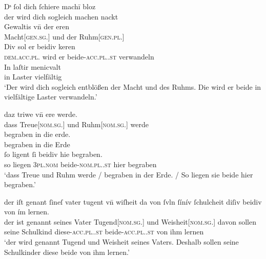 \begin{exe}
\ex \label{ex:beid2p2combrem}
	\begin{xlist}
	\ex \label{ex:beid2p2combrem_1}
		\gll Dˢ ſol dich ſchiere machī bloz \\
			der wird dich sogleich machen nackt \\
	\sn \gll Gewaltis vn̄ der eren \\
			Macht[\textsc{gen.sg.\FemI}] und der Ruhm[\textsc{gen.pl.\FemI}] \\
	\sn \gll Div sol er beidiv keren \\
			\textsc{dem.acc.pl.\NeutI} wird er beide-\textsc{acc.pl.\NeutI.st}
			verwandeln \\
	\sn \gll In laſtir menicvalt \\
			in Laster vielfältig \\
		\trans `Der wird dich sogleich entblößen der Macht und des Ruhms.
			Die wird er beide in vielfältige Laster verwandeln.'
			\parencite[M317: V.~13020--13023]{rem}

	\ex \label{ex:beid2p2combrem_2}
		\gll daz triwe vn̄ ere werde. \\
			dass Treue[\textsc{nom.sg.\FemI}] und Ruhm[\textsc{nom.sg.\FemI}] werde \\
	\sn \gll begraben in die erde. \\
			begraben in die Erde \\
	\sn \gll ſo ligent ſi beidiv hie begraben. \\
			so liegen \textsc{3pl\subI.nom} beide-\textsc{nom.pl.\NeutI.st} hier
			begraben \\
		\trans `dass Treue und Ruhm werde / begraben in der Erde. / So
			liegen sie beide hier begraben.'
			\parencite[M342: V.~18661--18663]{rem}

	\ex \label{ex:beid2p2combrem_3}
		\gll der iſt genant ſineſ vater tugent vn̄ wiſheit
			{da von} ſvln ſínív ſchulcheit\upshape\footnotemark{} diſiv
			beidiv von ím lernen. \\
			der ist genannt seines Vater Tugend[\textsc{nom.sg.\FemI}] und
			Weisheit[\textsc{nom.sg.\FemI}] davon sollen seine Schulkind
			diese-\textsc{acc.pl.\NeutI.st} beide-\textsc{acc.pl.\NeutI.st} von ihm
			lernen \\
		\trans `der wird genannt Tugend und Weisheit seines Vaters.
			Deshalb sollen seine Schulkinder diese beide von ihm lernen.'
			\parencite[M401: 108v,19--21]{rem}
	\end{xlist}
\end{exe}
%

